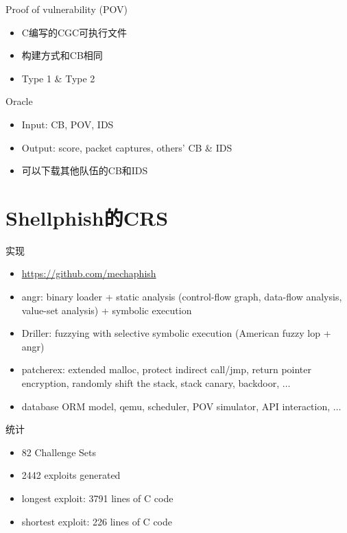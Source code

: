 \documentclass{beamer}
\begin{document}
\begin{frame}
  \begin{block}{Proof of vulnerability (POV)}
    \begin{itemize}
      \item C编写的CGC可执行文件
      \item 构建方式和CB相同
      \item Type 1 \& Type 2
    \end{itemize}
  \end{block}
\end{frame}

\begin{frame}
  \begin{block}{Oracle}
    \begin{itemize}
      \item Input: CB, POV, IDS
      \item Output: score, packet captures, others' CB \& IDS
      \item 可以下载其他队伍的CB和IDS
    \end{itemize}
  \end{block}
\end{frame}

\section{Shellphish的CRS}

\begin{frame}
  \begin{block}{实现}
    \begin{itemize}
      \item \url{https://github.com/mechaphish}
      \item angr: binary loader + static analysis (control-flow graph, data-flow analysis, value-set analysis) + symbolic execution
      \item Driller: fuzzying with selective symbolic execution (American fuzzy lop + angr)
      \item patcherex: extended malloc, protect indirect call/jmp, return pointer encryption, randomly shift the stack, stack canary, backdoor, $\ldots$
      \item database ORM model, qemu, scheduler, POV simulator, API interaction, $\ldots$
    \end{itemize}
  \end{block}
\end{frame}

\begin{frame}
  \begin{block}{统计}
    \begin{itemize}
      \item 82 Challenge Sets
      \item 2442 exploits generated
      \item longest exploit: 3791 lines of C code
      \item shortest exploit: 226 lines of C code
    \end{itemize}
  \end{block}
\end{frame}
\end{document}
